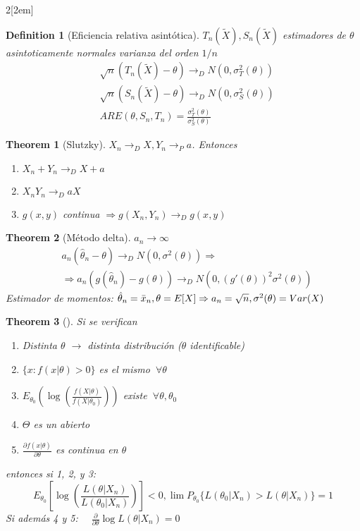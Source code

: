\documentclass[leqno]{article}
\newtheorem*{theorem}{Theorem}
\newtheorem*{definition}{Definition}
\begin{document}
\begin{multicols}{2}[\columnsep2em]
\begin{definition}[Eficiencia relativa asintótica] $T_n(\tilde{X}), S_n(\tilde{X})$ estimadores de $\theta$ asintoticamente normales varianza del orden $1 / n$
  \begin{align*}
	 &\sqrt{n}(T_n(\tilde{X})-\theta )  \to _D N(0, \sigma_T^2(\theta)) \\
	 &\sqrt{n}(S_n(\tilde{X})-\theta )  \to _D N(0, \sigma_S^2(\theta)) \\
	 &ARE(\theta, S_n, T_n) = \frac{\sigma ^2_T(\theta )}{\sigma ^2_S(\theta )}
  \end{align*}

\end{definition}

\begin{theorem}[Slutzky] $X_n \to _D X, Y_n \to _P a$. Entonces
  \begin{enumerate}[topsep=-6pt, itemsep=0pt]
	\item $X_n + Y_n \to _D X+a$ 
	\item $X_nY_n \to _D aX$
	\item $g(x,y)$ continua  $\Rightarrow g(X_n, Y_n) \to _D g(x,y)$
  \end{enumerate}
\end{theorem}

\begin{theorem}[Método delta] $a_n \to \infty$
  \begin{align*}
  &a_n(\hat{\theta }_n-\theta ) \to _D N(0, \sigma ^2(\theta )) \Rightarrow \\
  & \Rightarrow a_n(g(\hat{\theta }_n)-g(\theta) ) \to _D N(0, (g'(\theta ))^2 \sigma ^2(\theta ))
  \end{align*}
  Estimador de momentos: $\hat{\theta }_n = \bar x_n, \theta = E[X] \Rightarrow \\ a_n = \sqrt{n}, \sigma ^2(\theta) = Var(X)$
\end{theorem}

\begin{theorem}[] Si se verifican 
  \begin{enumerate}[topsep=-6pt, itemsep=0pt]
    \item Distinta $\theta$ $\rightarrow$ distinta distribución ($\theta$ identificable)
	\item $\{x:f(x|\theta )>0\}$ es el mismo $\ \forall \theta $
	\item $E_{\theta _0}( \log (\frac{f(X|\theta )}{f(X|\theta _0)}))$ existe $\ \forall \theta, \theta_0 $ 
	\item  $\Theta$ es un abierto
	\item  $\frac{\partial f(x|\theta )}{\partial \theta }$ es continua en $\theta$
  \end{enumerate}
  entonces si 1, 2, y 3:
  \[
	E_{\theta _0}\left[ \log \left( \frac{L(\theta |X_n)}{L(\theta _{0}|X_n)} \right)  \right] <0, \lim P_{\theta _0}\{L(\theta _0|X_n)>L(\theta |X_n)\} = 1
  \] 
  Si además 4 y 5: $\quad \displaystyle \frac{\partial}{\partial\theta }\log L(\theta |X_n)=0$ 
\end{theorem}


\end{multicols}
\end{document}

